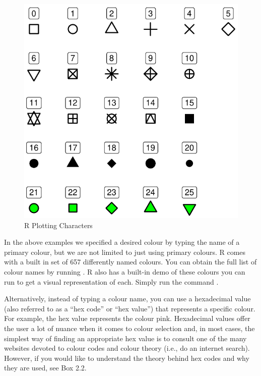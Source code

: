 \begin{figure}[h]
\centering
\includegraphics[scale = 0.75]{graphics/ch2Figs/points.pdf}
\caption{R Plotting Characters}
\label{fig:points.pdf}
\end{figure}

\vspace{2em}

\noindent
In the above examples we specified a desired colour by typing the name of a primary colour, but we are not limited to just using primary colours. R comes with a built in set of 657 differently named colours.  You can obtain the full list of colour names by running .  R also has a built-in demo of these colours you can run to get a visual representation of each.  Simply run the command . 

Alternatively, instead of typing a colour name, you can use a hexadecimal value (also referred to as a ``hex code'' or ``hex value'') that represents a specific colour. For example, the hex value  represents the colour pink. Hexadecimal values offer the user a lot of nuance when it comes to colour selection and, in most cases, the simplest way of finding an appropriate hex value is to consult one of the many websites devoted to colour codes and colour theory (i.e., do an internet search). However, if you would like to understand the theory behind hex codes and why they are used, see Box 2.2.

